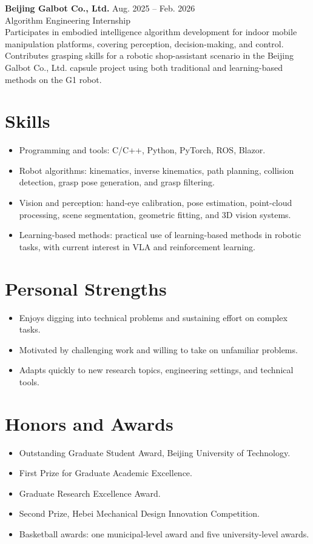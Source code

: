 \documentclass[11pt,a4paper]{article}
\newcommand{\entry}[4]{%
  \textbf{#1} \hfill #2\\
  {\color{textgray}#3} \hfill {#4}\\[-2pt]
}
\begin{document}
\entry{Beijing Galbot Co., Ltd.}{Aug. 2025 -- Feb. 2026}{Algorithm Engineering}{Internship}
Participates in embodied intelligence algorithm development for indoor mobile manipulation platforms, covering perception, decision-making, and control. Contributes grasping skills for a robotic shop-assistant scenario in the Beijing Galbot Co., Ltd. capsule project using both traditional and learning-based methods on the G1 robot.

\section*{Skills}
\begin{itemize}
	\item Programming and tools: C/C++, Python, PyTorch, ROS, Blazor.
	\item Robot algorithms: kinematics, inverse kinematics, path planning, collision detection, grasp pose generation, and grasp filtering.
	\item Vision and perception: hand-eye calibration, pose estimation, point-cloud processing, scene segmentation, geometric fitting, and 3D vision systems.
	\item Learning-based methods: practical use of learning-based methods in robotic tasks, with current interest in VLA and reinforcement learning.
\end{itemize}

\section*{Personal Strengths}
\begin{itemize}
	\item Enjoys digging into technical problems and sustaining effort on complex tasks.
	\item Motivated by challenging work and willing to take on unfamiliar problems.
	\item Adapts quickly to new research topics, engineering settings, and technical tools.
\end{itemize}

\section*{Honors and Awards}
\begin{itemize}
	\item Outstanding Graduate Student Award, Beijing University of Technology.
	\item First Prize for Graduate Academic Excellence.
	\item Graduate Research Excellence Award.
	\item Second Prize, Hebei Mechanical Design Innovation Competition.
	\item Basketball awards: one municipal-level award and five university-level awards.
\end{itemize}
\end{document}
